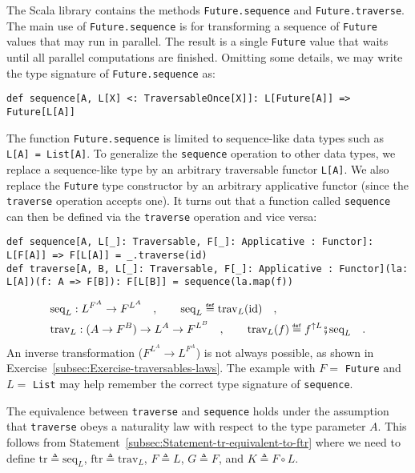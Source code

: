 The Scala library contains the methods \lstinline!Future.sequence!
and \lstinline!Future.traverse!. The main use of \lstinline!Future.sequence!
is for transforming a sequence of \lstinline!Future! values that
may run in parallel. The result is a single \lstinline!Future! value
that waits until all parallel computations are finished. Omitting
some details, we may write the type signature of \lstinline!Future.sequence!
as:
\begin{lstlisting}
def sequence[A, L[X] <: TraversableOnce[X]]: L[Future[A]] => Future[L[A]]
\end{lstlisting}

The function \lstinline!Future.sequence! is limited to sequence-like
data types such as \lstinline!L[A] = List[A]!. To generalize the
\lstinline!sequence! operation to other data types, we replace a
sequence-like type by an arbitrary traversable functor \lstinline!L[A]!.
We also replace the \lstinline!Future! type constructor by an arbitrary
applicative functor (since the \lstinline!traverse! operation accepts
one). It turns out that a function called \lstinline!sequence! can
then be defined via the \lstinline!traverse! operation and vice versa:
\begin{lstlisting}
def sequence[A, L[_]: Traversable, F[_]: Applicative : Functor]: L[F[A]] => F[L[A]] = _.traverse(id)
def traverse[A, B, L[_]: Traversable, F[_]: Applicative : Functor](la: L[A])(f: A => F[B]): F[L[B]] = sequence(la.map(f))
\end{lstlisting}
\begin{align*}
 & \text{seq}_{L}:L^{F^{A}}\rightarrow F^{L^{A}}\quad,\quad\quad\text{seq}_{L}\triangleq\text{trav}_{L}(\text{id})\quad,\\
 & \text{trav}_{L}:(A\rightarrow F^{B})\rightarrow L^{A}\rightarrow F^{L^{B}}\quad,\quad\quad\text{trav}_{L}(f)\triangleq f^{\uparrow L}\bef\text{seq}_{L}\quad.
\end{align*}
An inverse transformation ($F^{L^{A}}\rightarrow L^{F^{A}}$) is not
always possible, as shown in Exercise~\ref{subsec:Exercise-traversables-laws}.
The example with $F=$ \lstinline!Future! and $L=$ \lstinline!List!
may help remember the correct type signature of \lstinline!sequence!.

The equivalence between \lstinline!traverse! and \lstinline!sequence!
holds under the assumption that \lstinline!traverse! obeys a naturality
law with respect to the type parameter $A$. This follows from Statement~\ref{subsec:Statement-tr-equivalent-to-ftr}
where we need to define $\text{tr}\triangleq\text{seq}_{L}$, $\text{ftr}\triangleq\text{trav}_{L}$,
$F\triangleq L$, $G\triangleq F$, and $K\triangleq F\circ L$. 

